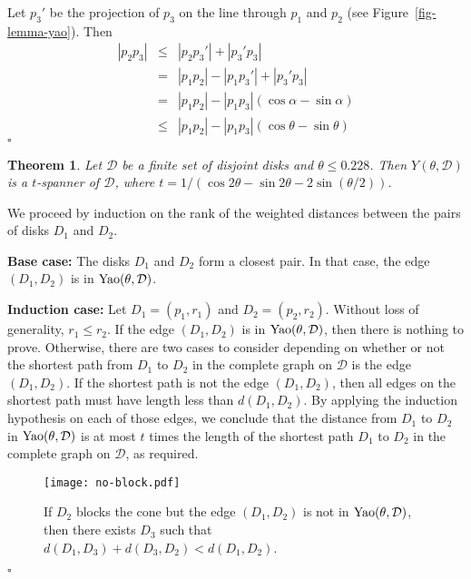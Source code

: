 \documentclass[pdftex,leqno,fleqn,12pt]{article}
\newcommand{\YAO}{{\rm{Yao}}}
\newtheorem{theorem}{Theorem}[section]
\newenvironment{proof}{{\textit Proof:} \rm}{\hfill $\square$ \medskip\\}
\begin{document}
\begin{proof} Let $p_3'$ be the projection of $p_3$ on the line through $p_1$
and $p_2$ (see Figure~\ref{fig-lemma-yao}). Then \begin{eqnarray*} |p_2p_3| &
\leq & |p_2p_3'|+|p_3'p_3|\\ & = & |p_1p_2| - |p_1p_3'| + |p_3'p_3|\\ & = &
|p_1p_2| - |p_1p_3|(\cos\alpha-\sin\alpha)\\ &\leq& |p_1p_2| -
|p_1p_3|(\cos\theta-\sin\theta) \end{eqnarray*} \end{proof}



\begin{theorem}\label{thm-add-yao} Let $\mathcal{D}$ be a finite set of
disjoint disks and $\theta\leq 0.228$.  Then $Y(\theta,\mathcal{D})$ is a
$t$-spanner of $\mathcal{D}$, where $t=1/(\cos 2\theta-\sin
2\theta-2\sin(\theta/2))$.  \end{theorem} \begin{proof} We proceed by induction
on the rank of the weighted distances between the pairs of disks $D_1$ and
$D_2$.

\textbf{Base case:} The disks $D_1$ and $D_2$ form a closest pair. In that case, the edge
$(D_1,D_2)$ is in $\YAO(\theta,\mathcal{D})$.

\textbf{Induction case:} Let $D_1=(p_1,r_1)$ and $D_2=(p_2,r_2)$. Without loss
of generality, $r_1\leq r_2$. If the edge $(D_1,D_2)$ is in
$\YAO(\theta,\mathcal{D})$, then there is nothing to prove.  Otherwise, there
are two cases to consider depending on whether or not the shortest path from
$D_1$ to $D_2$ in the complete graph on $\mathcal{D}$ is the edge $(D_1,D_2)$.
If the shortest path is not the edge $(D_1,D_2)$, then all edges on the
shortest path must have length less than $d(D_1,D_2)$. By applying the
induction hypothesis on each of those edges, we conclude that the distance from
$D_1$ to $D_2$ in $\YAO(\theta,\mathcal{D})$ is at most $t$ times the length of
the shortest path $D_1$ to $D_2$ in the complete graph on $\mathcal{D}$, as
required.

\begin{figure}
\centering\texttt{[image: no-block.pdf]}\caption{If $D_2$ blocks the cone but the edge $(D_1,D_2)$ is not in $\YAO(\theta,\mathcal{D})$, then there exists $D_3$ such that $d(D_1,D_3)+d(D_3,D_2)<d(D_1,D_2)$.}\label{fig-no-block}
\end{figure}


\end{proof}
\end{document}
